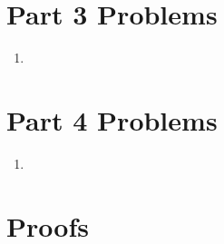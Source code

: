 \documentclass[11pt]{article}
\begin{document}
\section*{Part 3 Problems}
\begin{enumerate}
    \item 
\end{enumerate}
\pagebreak

\section*{Part 4 Problems}
\begin{enumerate}
    \item 
\end{enumerate}
\pagebreak

\section*{Proofs}
\end{document}
